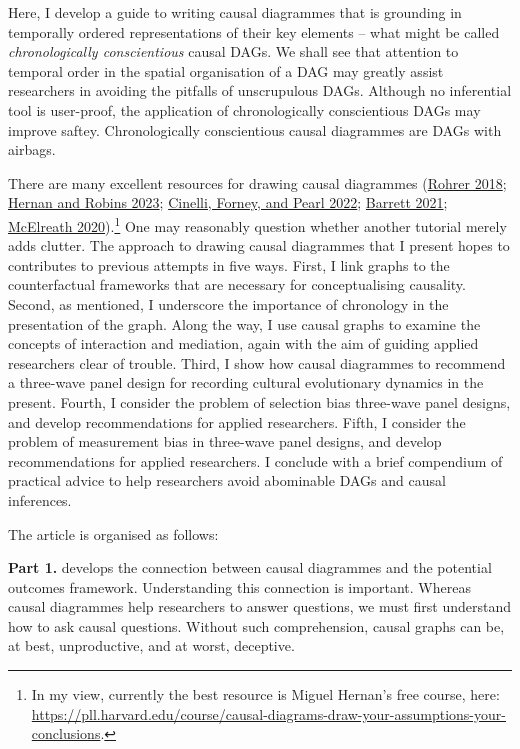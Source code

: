 \documentclass[
  singlecolumn]{report}
\begin{document}
Here, I develop a guide to writing causal diagrammes that is grounding
in temporally ordered representations of their key elements -- what
might be called \emph{chronologically conscientious} causal DAGs. We
shall see that attention to temporal order in the spatial organisation
of a DAG may greatly assist researchers in avoiding the pitfalls of
unscrupulous DAGs. Although no inferential tool is user-proof, the
application of chronologically conscientious DAGs may improve saftey.
Chronologically conscientious causal diagrammes are DAGs with airbags.

There are many excellent resources for drawing causal diagrammes
(\protect\hyperlink{ref-rohrer2018}{Rohrer 2018};
\protect\hyperlink{ref-hernan2023}{Hernan and Robins 2023};
\protect\hyperlink{ref-cinelli2022}{Cinelli, Forney, and Pearl 2022};
\protect\hyperlink{ref-barrett2021}{Barrett 2021};
\protect\hyperlink{ref-mcelreath2020}{McElreath 2020}).\footnote{In my
  view, currently the best resource is Miguel Hernan's free course,
  here:
  \url{https://pll.harvard.edu/course/causal-diagrams-draw-your-assumptions-your-conclusions}.}
One may reasonably question whether another tutorial merely adds
clutter. The approach to drawing causal diagrammes that I present hopes
to contributes to previous attempts in five ways. First, I link graphs
to the counterfactual frameworks that are necessary for conceptualising
causality. Second, as mentioned, I underscore the importance of
chronology in the presentation of the graph. Along the way, I use causal
graphs to examine the concepts of interaction and mediation, again with
the aim of guiding applied researchers clear of trouble. Third, I show
how causal diagrammes to recommend a three-wave panel design for
recording cultural evolutionary dynamics in the present. Fourth, I
consider the problem of selection bias three-wave panel designs, and
develop recommendations for applied researchers. Fifth, I consider the
problem of measurement bias in three-wave panel designs, and develop
recommendations for applied researchers. I conclude with a brief
compendium of practical advice to help researchers avoid abominable DAGs
and causal inferences.

The article is organised as follows:

\textbf{Part 1.} develops the connection between causal diagrammes and
the potential outcomes framework. Understanding this connection is
important. Whereas causal diagrammes help researchers to answer
questions, we must first understand how to ask causal questions. Without
such comprehension, causal graphs can be, at best, unproductive, and at
worst, deceptive.
\end{document}
